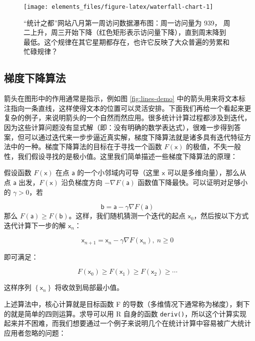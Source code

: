 \documentclass[
  b5paper,
  UTF8,twoside]{book}
\begin{document}
\begin{figure}

{\centering \texttt{[image: elements\_files/figure-latex/waterfall-chart-1]} 

}

\caption[``统计之都''网站八月第一周访问数据瀑布图]{``统计之都''网站八月第一周访问数据瀑布图：周一访问量为 939， 周二上升，周三开始下降（红色矩形表示访问量下降），直到周末降到最低。这个规律在其它星期都存在，也许它反映了大众普遍的劳累和忙碌规律？}\label{fig:waterfall-chart}
\end{figure}





\subsection{梯度下降算法}\label{subsec:grad-desc}

箭头在图形中的作用通常是指示，例如图 \ref{fig:lines-demo} 中的箭头用来将文本标注指向一条直线，这样使得文本的位置可以灵活安排。下面我们再给一个看起来更复杂的例子，来说明箭头的一个自然而然应用。很多统计计算过程都涉及到迭代，因为这些计算问题没有显式解（即：没有明确的数学表达式），很难一步得到答案，但可以通过迭代来一步步逼近真实解，梯度下降算法就是诸多具有迭代特征方法中的一种。梯度下降算法的目标在于寻找一个函数 \(F(\mathsf{x})\) 的极值，不失一般性，我们假设寻找的是极小值。这里我们简单描述一些梯度下降算法的原理：

假设函数 \(F(\mathsf{x})\) 在点 \(\mathsf{a}\) 的一个小邻域内可导（这里 \(\mathsf{x}\) 可以是多维向量），那么从点 \(\mathsf{a}\) 出发，\(F(\mathsf{x})\) 沿负梯度方向 \(-\nabla F(\mathsf{a})\) 函数值下降最快。可以证明对足够小的 \(\gamma>0\)，若

\[\mathsf{b} = \mathsf{a}-\gamma\nabla F(\mathsf{a})\]
那么 \(F(\mathsf{a})\geq F(\mathsf{b})\)。这样，我们随机猜测一个迭代的起点 \(\mathsf{x}_{0}\)，然后按以下方式迭代计算下一步的解 \(\mathsf{x}_{n}\)：

\[\mathsf{x}_{n+1} = \mathsf{x}_{n}-\gamma\nabla F(\mathsf{x}_{n}),\ n\ge0\]

即可满足：

\[F(\mathsf{x}_{0})\ge F(\mathsf{x}_{1})\ge F(\mathsf{x}_{2})\ge\cdots\]

这样序列 \(\left\{ \mathsf{x}_{n}\right\}\) 将收敛到局部最小值。

上述算法中，核心计算就是目标函数 F 的导数（多维情况下通常称为梯度），剩下的就是简单的四则运算。求导可以用 R 自身的函数 \texttt{deriv()}，所以这个计算实现起来并不困难，而我们想要通过一个例子来说明几个在统计计算中容易被广大统计应用者忽略的问题：
\end{document}

